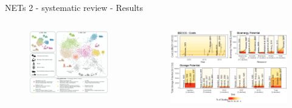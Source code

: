 \documentclass[9pt]{beamer}
\begin{document}
\begin{frame}{NETs 2 - systematic review - Results}
	\begin{columns}
		\begin{column}{0.5\linewidth}
			\begin{figure}
				\includegraphics[width=\linewidth]{images/NETs_network.png}
			\end{figure}
		\end{column}
		\begin{column}{0.5\linewidth}
			\begin{figure}
				\includegraphics[width=\linewidth]{images/panel.png}
			\end{figure}
		\end{column}
	\end{columns}
\end{frame}
\end{document}
